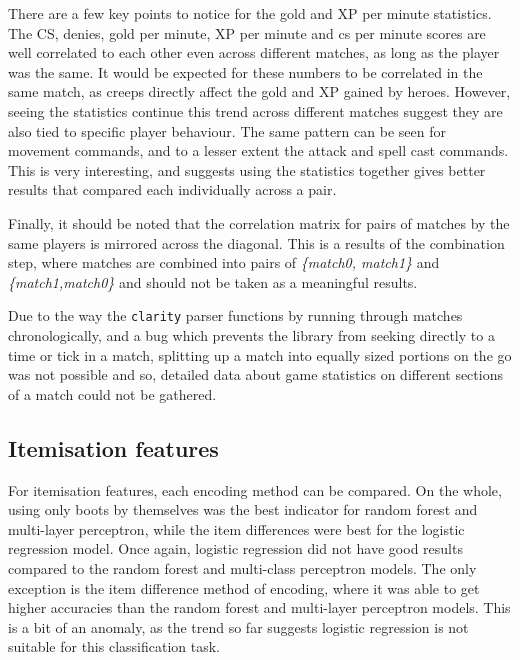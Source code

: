 \documentclass[Report.tex]{subfiles}
\begin{document}
There are a few key points to notice for the gold and XP per minute statistics. The CS, denies, gold per minute, XP per minute and cs per minute scores are well correlated to each other even across different matches, as long as the player was the same. It would be expected for these numbers to be correlated in the same match, as creeps directly affect the gold and XP gained by heroes. However, seeing the statistics continue this trend across different matches suggest they are also tied to specific player behaviour. The same pattern can be seen for movement commands, and to a lesser extent the attack and spell cast commands. This is very interesting, and suggests using the statistics together gives better results that compared each individually across a pair. 

Finally, it should be noted that the correlation matrix for pairs of matches by the same players is mirrored across the diagonal. This is a results of the combination step, where matches are combined into pairs of \textit{\{match0, match1\}} and \textit{\{match1,match0\}} and should not be taken as a meaningful results.


Due to the way the \texttt{clarity} parser functions by running through matches chronologically, and a bug which prevents the library from seeking directly to a time or tick in a match, splitting up a match into equally sized portions on the go was not possible and so, detailed data about game statistics on different sections of a match could not be gathered.  

\subsection{Itemisation features}

For itemisation features, each encoding method can be compared. On the whole, using only boots by themselves was the best indicator for random forest and multi-layer perceptron, while the item differences were best for the logistic regression model. Once again, logistic regression did not have good results compared to the random forest and multi-class perceptron models. The only exception is the item difference method of encoding, where it was able to get higher accuracies than the random forest and multi-layer perceptron models. This is a bit of an anomaly, as the trend so far suggests logistic regression is not suitable for this classification task.  
\end{document}
